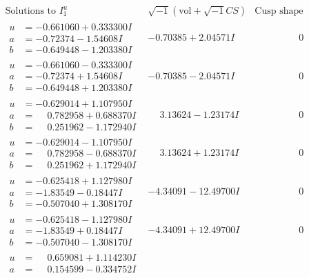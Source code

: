 \documentclass[1p]{elsarticle_modified}
\theoremstyle{definition}
\newcommand{\I}{\sqrt{-1}}
\begin{document}
$$\begin{array}{c|c|c}
\text{Solutions to }I^u_{1}& \I (\text{vol} + \sqrt{-1}CS) & \text{Cusp shape}\\
 \hline 
\begin{aligned}
u &= -0.661060 + 0.333300 I \\
a &= -0.72374 - 1.54608 I \\
b &= -0.649448 - 1.203380 I\end{aligned}
 & -0.70385 + 2.04571 I & \phantom{-0.000000 } 0 \\ \hline\begin{aligned}
u &= -0.661060 - 0.333300 I \\
a &= -0.72374 + 1.54608 I \\
b &= -0.649448 + 1.203380 I\end{aligned}
 & -0.70385 - 2.04571 I & \phantom{-0.000000 } 0 \\ \hline\begin{aligned}
u &= -0.629014 + 1.107950 I \\
a &= \phantom{-}0.782958 + 0.688370 I \\
b &= \phantom{-}0.251962 - 1.172940 I\end{aligned}
 & \phantom{-}3.13624 - 1.23174 I & \phantom{-0.000000 } 0 \\ \hline\begin{aligned}
u &= -0.629014 - 1.107950 I \\
a &= \phantom{-}0.782958 - 0.688370 I \\
b &= \phantom{-}0.251962 + 1.172940 I\end{aligned}
 & \phantom{-}3.13624 + 1.23174 I & \phantom{-0.000000 } 0 \\ \hline\begin{aligned}
u &= -0.625418 + 1.127980 I \\
a &= -1.83549 - 0.18447 I \\
b &= -0.507040 + 1.308170 I\end{aligned}
 & -4.34091 - 12.49700 I & \phantom{-0.000000 } 0 \\ \hline\begin{aligned}
u &= -0.625418 - 1.127980 I \\
a &= -1.83549 + 0.18447 I \\
b &= -0.507040 - 1.308170 I\end{aligned}
 & -4.34091 + 12.49700 I & \phantom{-0.000000 } 0 \\ \hline\begin{aligned}
u &= \phantom{-}0.659081 + 1.114230 I \\
a &= \phantom{-}0.154599 - 0.334752 I \\

\end{aligned}
\end{array}$$
\end{document}
